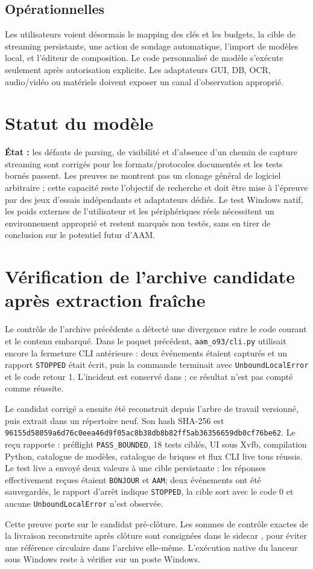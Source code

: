 \documentclass[11pt,a4paper]{article}
\begin{document}
\subsection{Opérationnelles}
Les utilisateurs voient désormais le mapping des clés et les budgets, la cible de streaming persistante, une action de sondage automatique, l'import de modèles local, et l'éditeur de composition. Le code personnalisé de modèle s'exécute seulement après autorisation explicite. Les adaptateurs GUI, DB, OCR, audio/vidéo ou matériels doivent exposer un canal d'observation approprié.

\section{Statut du modèle}
\textbf{État :} les défauts de parsing, de visibilité et d'absence d'un chemin de capture streaming sont corrigés pour les formats/protocoles documentés et les tests bornés passent. Les preuves ne montrent pas un clonage général de logiciel arbitraire ; cette capacité reste l'objectif de recherche et doit être mise à l'épreuve par des jeux d'essais indépendants et adaptateurs dédiés. Le test Windows natif, les poids externes de l'utilisateur et les périphériques réels nécessitent un environnement approprié et restent marqués non testés, sans en tirer de conclusion sur le potentiel futur d'AAM.

\section{Vérification de l’archive candidate après extraction fraîche}
Le contrôle de l’archive précédente a détecté une divergence entre le code courant et le contenu embarqué. Dans le paquet précédent, \verb|aam_o93/cli.py| utilisait encore la fermeture CLI antérieure : deux événements étaient capturés et un rapport \verb|STOPPED| était écrit, puis la commande terminait avec \verb|UnboundLocalError| et le code retour 1. L’incident est conservé dans ; ce résultat n’est pas compté comme réussite.

Le candidat corrigé a ensuite été reconstruit depuis l’arbre de travail versionné, puis extrait dans un répertoire neuf. Son hash SHA-256 est \verb|96155d58059a6d76c0eea46d9f05ac8b38db8b82ff5ab36356659db0cf76be62|. Le reçu  rapporte : préflight \verb|PASS_BOUNDED|, 18 tests ciblés, UI sous Xvfb, compilation Python, catalogue de modèles, catalogue de briques et flux CLI live tous réussis. Le test live a envoyé deux valeurs à une cible persistante : les réponses effectivement reçues étaient \verb|BONJOUR| et \verb|AAM|; deux événements ont été sauvegardés, le rapport d’arrêt indique \verb|STOPPED|, la cible sort avec le code 0 et aucune \verb|UnboundLocalError| n’est observée.

Cette preuve porte sur le candidat pré-clôture. Les sommes de contrôle exactes de la livraison reconstruite après clôture sont consignées dans le sidecar , pour éviter une référence circulaire dans l’archive elle-même. L’exécution native du lanceur sous Windows reste à vérifier sur un poste Windows.
\end{document}
